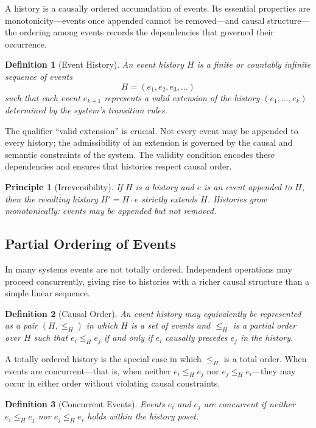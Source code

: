 \documentclass[12pt]{article}
\newtheorem{definition}{Definition}
\newtheorem{principle}{Principle}
\begin{document}
A history is a causally ordered accumulation of events. Its essential properties are
monotonicity---events once appended cannot be removed---and causal structure---the ordering
among events records the dependencies that governed their occurrence.

\begin{definition}[Event History]
An \emph{event history} $H$ is a finite or countably infinite sequence of events
\[
H = (e_1, e_2, e_3, \ldots)
\]
such that each event $e_{k+1}$ represents a valid extension of the history $(e_1, \ldots, e_k)$
determined by the system's transition rules.
\end{definition}

The qualifier ``valid extension'' is crucial. Not every event may be appended to every history;
the admissibility of an extension is governed by the causal and semantic constraints of the
system. The validity condition encodes these dependencies and ensures that histories respect
causal order.

\begin{principle}[Irreversibility]
If $H$ is a history and $e$ is an event appended to $H$, then the resulting history
$H' = H \cdot e$ strictly extends $H$. Histories grow monotonically: events may be appended
but not removed.
\end{principle}

\subsection{Partial Ordering of Events}

In many systems events are not totally ordered. Independent operations may proceed concurrently,
giving rise to histories with a richer causal structure than a simple linear sequence.

\begin{definition}[Causal Order]
An \emph{event history} may equivalently be represented as a pair $(H, \leq_H)$ in which $H$
is a set of events and $\leq_H$ is a partial order over $H$ such that $e_i \leq_H e_j$ if and
only if $e_i$ causally precedes $e_j$ in the history.
\end{definition}

A totally ordered history is the special case in which $\leq_H$ is a total order. When events
are concurrent---that is, when neither $e_i \leq_H e_j$ nor $e_j \leq_H e_i$---they may
occur in either order without violating causal constraints.

\begin{definition}[Concurrent Events]
Events $e_i$ and $e_j$ are \emph{concurrent} if neither $e_i \leq_H e_j$ nor
$e_j \leq_H e_i$ holds within the history poset.
\end{definition}
\end{document}
